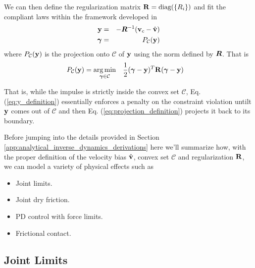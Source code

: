 We can then define the regularization matrix ${\mathbf{R}}=\text{diag}(\{R_i\})$ and
fit the compliant laws within the framework developed in \cite{bib:todorov2014}
\begin{eqnarray}
	\mf{y} &=& -\vf{R}^{-1}(\mf{v}_c-\hat{\mf{v}}) \label{eq:y_definition}\\
	\bgamma &=& P_\mathcal{C}(\mf{y})
	\label{eq:projection_definition}
\end{eqnarray}
where $P_\mathcal{C}({\mathbf{y}})$ is the projection onto $\mathcal{C}$ of ${\mathbf{y}}$
using the norm defined by ${\bm{R}}$. That is
\begin{equation}
	\begin{aligned}
		P_\mathcal{C}({\mathbf{y}})=\operatorname*{arg\,min}_{{\bm\gamma}\in\mathcal{C}} \quad & \frac{1}{2}({\bm\gamma}-{\mathbf{y}})^T{\mathbf{R}}({\bm\gamma}-{\mathbf{y}})
	\end{aligned}
\end{equation}

That is, while the impulse is strictly inside the convex set $\mathcal{C}$, Eq.
(\ref{eq:y_definition}) essentially enforces a penalty on the constraint
violation untilt ${\mathbf{y}}$ comes out of $\mathcal{C}$ and then Eq.
(\ref{eq:projection_definition}) projects it back to its boundary.

Before jumping into the details provided in Section
\ref{app:analytical_inverse_dynamics_derivations} here we'll summarize how, with
the proper definition of the velocity bias $\hat{{\mathbf{v}}}$, convex set
$\mathcal{C}$ and regularization ${\mathbf{R}}$, we can model a variety of physical
effects such as
\begin{itemize}
	\item Joint limits.
	\item Joint dry friction.
	\item PD control with force limits.
	\item Frictional contact.
\end{itemize}

\subsection{Joint Limits}


